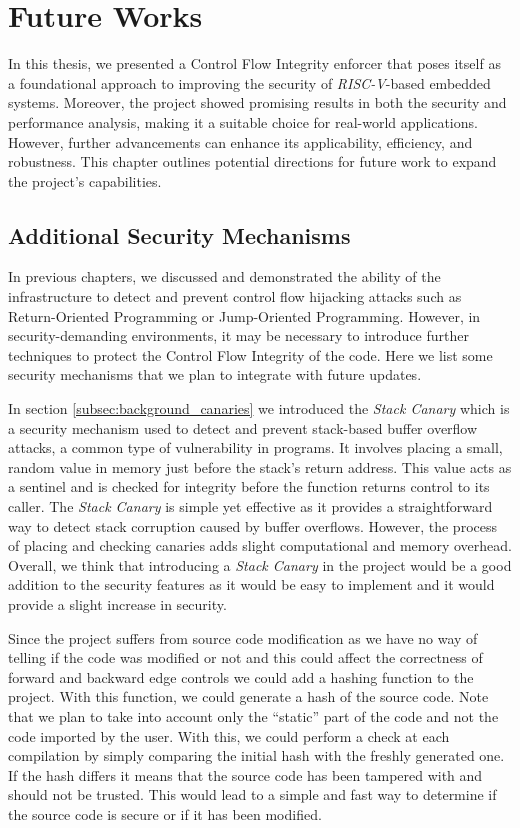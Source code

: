 \chapter{Future Works}
\label{cha:future}

In this thesis, we presented a Control Flow Integrity enforcer that poses itself
as a foundational approach to improving the security of \textit{RISC-V}-based
embedded systems. Moreover, the project showed promising results in both the
security and performance analysis, making it a suitable choice for real-world applications.
However, further advancements can enhance its applicability, efficiency, and robustness.
This chapter outlines potential directions for future work to expand the project's
capabilities.

\section{Additional Security Mechanisms}
\label{sec:future_security}

In previous chapters, we discussed and demonstrated the ability of the
infrastructure to detect and prevent control flow hijacking attacks such as
Return-Oriented Programming or Jump-Oriented Programming. However, in security-demanding
environments, it may be necessary to introduce further techniques to protect the
Control Flow Integrity of the code. Here we list some security mechanisms that
we plan to integrate with future updates.

In section \ref{subsec:background_canaries} we introduced the \textit{Stack
Canary} which is a security mechanism used to detect and prevent stack-based buffer
overflow attacks, a common type of vulnerability in programs. It involves placing
a small, random value in memory just before the stack's return address. This value
acts as a sentinel and is checked for integrity before the function returns control
to its caller. The \textit{Stack Canary} is simple yet effective as it provides a
straightforward way to detect stack corruption caused by buffer overflows.
However, the process of placing and checking canaries adds slight computational and
memory overhead. Overall, we think that introducing a \textit{Stack Canary} in
the project would be a good addition to the security features as it would be
easy to implement and it would provide a slight increase in security.

Since the project suffers from source code modification as we have no way of
telling if the code was modified or not and this could affect the correctness of
forward and backward edge controls we could add a hashing function to the
project. With this function, we could generate a hash of the source code. Note that
we plan to take into account only the ``static'' part of the code and not the code
imported by the user. With this, we could perform a check at each compilation by
simply comparing the initial hash with the freshly generated one. If the hash
differs it means that the source code has been tampered with and should not be
trusted. This would lead to a simple and fast way to determine if the source code
is secure or if it has been modified.

